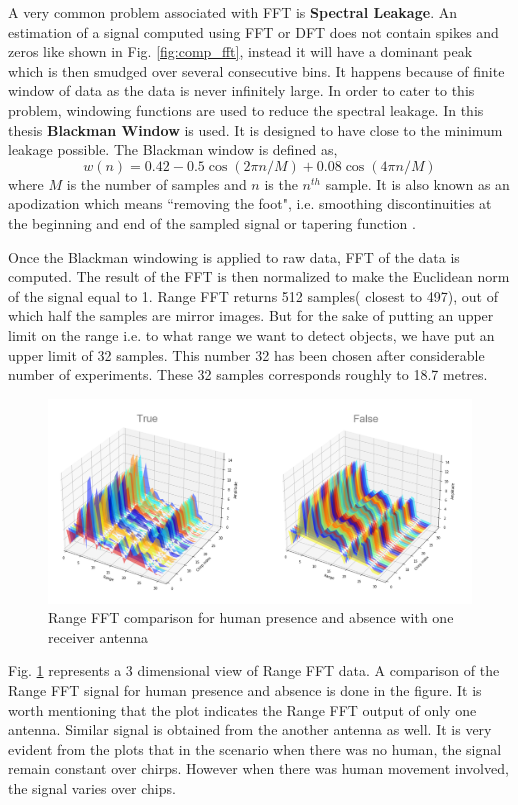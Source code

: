 A very common problem associated with FFT is \textbf{Spectral Leakage}. An estimation of a signal computed using FFT or DFT does not contain spikes and zeros like shown in Fig. \ref{fig:comp_fft}, instead it will have a dominant peak which is then smudged over several consecutive bins. It happens because of finite window of data as the data is never infinitely large. In order to cater to this problem, windowing functions are used to reduce the spectral leakage. In this thesis \textbf{Blackman Window} is used. It is designed to have close to the minimum leakage possible. The Blackman window is defined as,
\begin{equation*}
    w(n) = 0.42 - 0.5\cos(2\pi n/M) + 0.08\cos(4\pi n/M)
\end{equation*}
where \(M\) is the number of samples and \(n\) is the $n^{th}$ sample. It is also known as an apodization which means ``removing the foot", i.e. smoothing discontinuities at the beginning and end of the sampled signal or tapering function \cite{blackman1958measurement}\cite{oppenheim2010discrete}.

Once the Blackman windowing is applied to raw data, FFT of the data is computed. The result of the FFT is then normalized to make the Euclidean norm of the signal equal to 1. Range FFT returns 512 samples( closest to 497), out of which half the samples are mirror images. But for the sake of putting an upper limit on the range i.e. to what range we want to detect objects, we have put an upper limit of 32 samples. This number 32 has been chosen after considerable number of experiments. These 32 samples corresponds roughly to 18.7 metres. 
\begin{figure}[ht]
  \begin{center}
    \includegraphics[width=1\textwidth]{Master's thesis/images/fft_p_a.PNG} 
    \caption{Range FFT comparison for human presence and absence with one receiver antenna}
    \label{fig:FFT_3d1a}
  \end{center}
\end{figure} 
Fig. \ref{fig:FFT_3d1a} represents a 3 dimensional view of Range FFT data. A comparison of the Range FFT signal for human presence and absence is done in the figure. It is worth mentioning that the plot indicates the Range FFT output of only one antenna. Similar signal is obtained from the another antenna as well. 
It is very evident from the plots that in the scenario when there was no human, the signal remain constant over chirps. However when there was human movement involved, the signal varies over chips.

